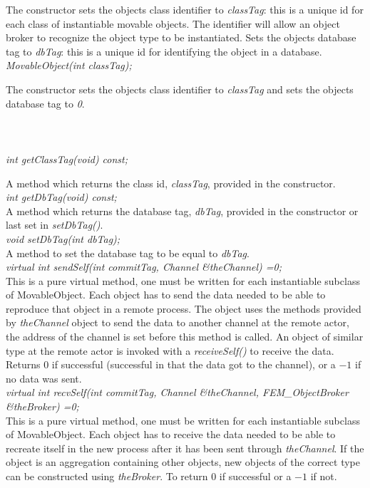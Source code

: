 The constructor sets the objects class identifier to {\em classTag}:
this is a unique id for each class of instantiable movable
objects. The identifier will allow an object broker to recognize the
object type to be instantiated. Sets the objects database tag to {\em
dbTag}: this is a unique id for identifying the object in a database. \\


{\em MovableObject(int classTag);}  

The constructor sets the objects class identifier to {\em classTag} 
and sets the objects database tag to {\em 0}. \\

 \\
\\ 

  \\
{\em int getClassTag(void) const;}

A method which returns the class id, {\em classTag}, provided in
the constructor. \\

{\em int getDbTag(void) const;}\\
A method which returns the database tag, {\em dbTag}, provided in
the constructor or last set in {\em setDbTag()}. \\

{\em void setDbTag(int dbTag);}\\
A method to set the database tag to be equal to {\em dbTag}. \\

{\em virtual int sendSelf(int commitTag, Channel \&theChannel) =0;} \\ 
This is a pure virtual method, one must be written for each
instantiable subclass of MovableObject. Each object has to send the
data needed to be able to reproduce that object in a remote
process. The object uses the methods provided by {\em theChannel}
object to send the data to another channel at the remote actor, the
address of the channel is set before this method is called.
An object of similar type at the remote actor is invoked with a  {\em
receiveSelf()} to receive the data. Returns $0$ if successful
(successful in that the data got to the channel), or a $-1$ if no
data was sent. \\  

{\em virtual int recvSelf(int commitTag, Channel \&theChannel, FEM\_ObjectBroker
\&theBroker) =0;} \\ 
This is a pure virtual method, one must be written for each
instantiable subclass of MovableObject. Each object has to receive the
data needed to be able to recreate itself in the new process after it
has been sent through {\em theChannel}. If the object is an
aggregation containing other objects, new objects of the correct type
can be constructed using {\em theBroker}. To return $0$ if successful
or a $-1$ if not. \\




